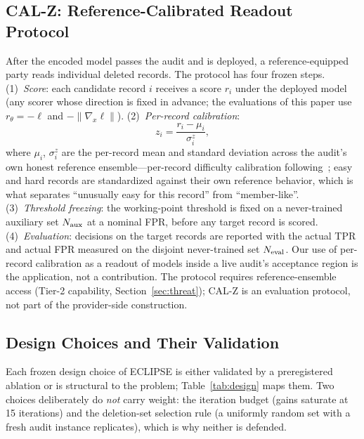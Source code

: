 \documentclass[lettersize,journal]{IEEEtran}
\begin{document}
\subsection{CAL-Z: Reference-Calibrated Readout Protocol}
\label{sec:calz}
After the encoded model passes the audit and is deployed, a
reference-equipped party reads individual deleted records.
The protocol has four frozen steps.
(1)~\emph{Score}: each candidate record $i$ receives a score
$r_i$ under the deployed model (any scorer whose direction is
fixed in advance; the evaluations of this paper use
$r_\theta = -\ell$ and $-\|\nabla_x \ell\|$).
(2)~\emph{Per-record calibration}:
\begin{equation}
\label{eq:calz}
z_i = \frac{r_i - \mu_i}{\sigma^z_i},
\end{equation}
where $\mu_i$, $\sigma^z_i$ are the per-record mean
and standard deviation across the audit's own honest reference
ensemble---per-record difficulty calibration
following~\cite{carlini2022membership}; easy and hard records
are standardized against their own reference behavior, which is
what separates ``unusually easy for this record'' from
``member-like''.
(3)~\emph{Threshold freezing}: the working-point threshold is
fixed on a never-trained auxiliary set $N_{\rm aux}$ at a
nominal FPR, before any target record is scored.
(4)~\emph{Evaluation}: decisions on the target records are
reported with the actual TPR and actual FPR measured on the
disjoint never-trained set $N_{\rm eval}$.
Our use of per-record calibration as a readout of models
inside a live audit's acceptance region is the application,
not a contribution. The protocol requires reference-ensemble
access (Tier-2 capability, Section~\ref{sec:threat});
CAL-Z is an evaluation protocol, not part of the provider-side
construction.

\subsection{Design Choices and Their Validation}
\label{sec:design-choices}
Each frozen design choice of ECLIPSE is either validated by a
preregistered ablation or is structural to the problem;
Table~\ref{tab:design} maps them. Two choices deliberately do
\emph{not} carry weight: the iteration budget (gains saturate
at 15 iterations) and the deletion-set selection rule (a
uniformly random set with a fresh audit instance replicates),
which is why neither is defended.
\end{document}
